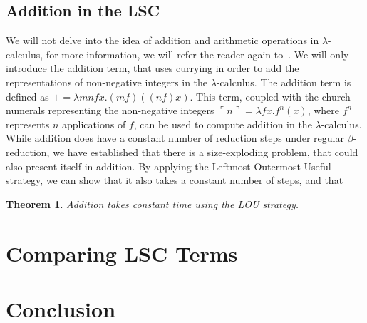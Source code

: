 \documentclass[12pt]{article}
\newtheorem{theorem}{Theorem}[section]
\begin{document}
\subsection{Addition in the LSC}
We will not delve into the idea of addition and arithmetic operations in $\lambda$-calculus, for more information, we will refer the reader again to~\cite{barendregt1984lambda}. We will only introduce the addition term, that uses currying in order to add the representations of non-negative integers in the $\lambda$-calculus.
The addition term is defined as $ + = \lambda m n f x .(m f)((n f) x)$. This term, coupled with the church numerals representing the non-negative integers $\ulcorner n \urcorner = \lambda f x . f^n (x)$, where $f^n$ represents $n$ applications of $f$, can be used to compute addition in the $\lambda$-calculus.
While addition does have a constant number of reduction steps under regular $\beta$-reduction, we have established that there is a size-exploding problem, that could also present itself in addition. By applying the Leftmost Outermost Useful strategy, we can show that it also takes a constant number of steps, and that

\begin{theorem} Addition takes constant time using the LOU strategy.
\end{theorem}
\section{Comparing LSC Terms}
\section{Conclusion}
\printbibliography
\end{document}
